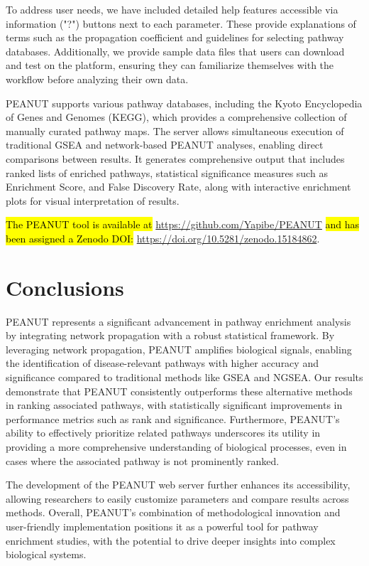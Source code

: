 \documentclass{article}
\begin{document}
To address user needs, we have included detailed help features accessible via information ("?") buttons next to each parameter. These provide explanations of terms such as the propagation coefficient and guidelines for selecting pathway databases. Additionally, we provide sample data files that users can download and test on the platform, ensuring they can familiarize themselves with the workflow before analyzing their own data.

PEANUT supports various pathway databases, including the Kyoto Encyclopedia of Genes and Genomes (KEGG), which provides a comprehensive collection of manually curated pathway maps. The server allows simultaneous execution of traditional GSEA and network-based PEANUT analyses, enabling direct comparisons between results. It generates comprehensive output that includes ranked lists of enriched pathways, statistical significance measures such as Enrichment Score, and False Discovery Rate, along with interactive enrichment plots for visual interpretation of results.

\hl{The PEANUT tool is available at} 
\url{https://github.com/Yapibe/PEANUT} \hl{and has been assigned a Zenodo DOI:} \url{https://doi.org/10.5281/zenodo.15184862}.

\section{Conclusions}
PEANUT represents a significant advancement in pathway enrichment analysis by integrating network propagation with a robust statistical framework. By leveraging network propagation, PEANUT amplifies biological signals, enabling the identification of disease-relevant pathways with higher accuracy and significance compared to traditional methods like GSEA and NGSEA. Our results demonstrate that PEANUT consistently outperforms these alternative methods in ranking associated pathways, with statistically significant improvements in performance metrics such as rank and significance. Furthermore, PEANUT's ability to effectively prioritize related pathways underscores its utility in providing a more comprehensive understanding of biological processes, even in cases where the associated pathway is not prominently ranked.

The development of the PEANUT web server further enhances its accessibility, allowing researchers to easily customize parameters and compare results across methods. Overall, PEANUT's combination of methodological innovation and user-friendly implementation positions it as a powerful tool for pathway enrichment studies, with the potential to drive deeper insights into complex biological systems.
\end{document}
